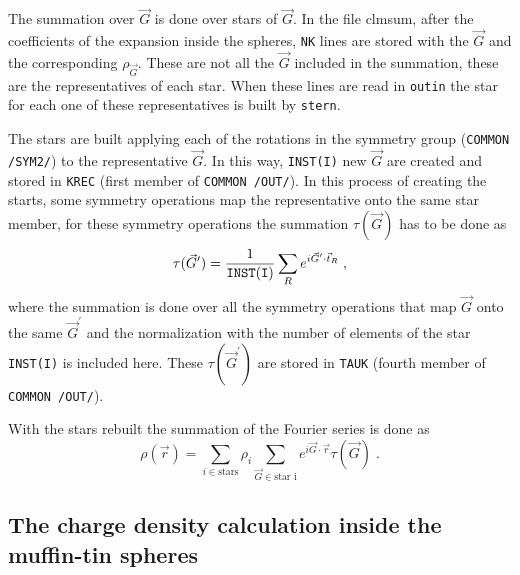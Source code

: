 \documentclass{article}
\begin{document}
The summation over $\vec{G}$ is done over stars of $\vec{G}$. In
the file clmsum, after the coefficients of the expansion inside the
spheres, \texttt{NK} lines are stored with the $\vec{G}$ and the
corresponding $\rho_{\vec{G}}$. These are not all the $\vec{G}$
included in the summation, these are the representatives of each
star. When these lines are read in \texttt{outin} the star for each
one of these representatives is built by \texttt{stern}.

The stars are built applying each of the rotations in the symmetry
group (\texttt{COMMON /SYM2/}) to the representative $\vec{G}$. In
this way, \texttt{INST(I)} new $\vec{G}$ are created and stored in
\texttt{KREC} (first member of \texttt{COMMON /OUT/}). In this process
of creating the starts, some symmetry operations map the
representative onto the same star member, for these symmetry
operations the summation $\tau(\vec{G})$ has to be done as 
\[
\tau(\vec{G}^\prime)={1\over \mathtt{INST(I)}} \sum_R e^{i\vec{G}^\prime\cdot\vec{t}_R}\;,
\]
where the summation is done over all the symmetry operations that map
$\vec{G}$ onto the same $\vec{G}^\prime$ and the normalization
with the number of elements of the star \texttt{INST(I)} is included
here.  These $\tau(\vec{G}^\prime)$ are stored in \texttt{TAUK}
(fourth member of \texttt{COMMON /OUT/}).

With the stars rebuilt the summation of the Fourier series is done as
\begin{equation}
\rho(\vec{r})=\sum_{i\in\mbox{stars}}\rho_i\sum_{\vec{G}\in\mbox{star
i}}e^{i\vec{G}\cdot\vec{r}}\tau(\vec{G})\;.
\label{rhoinst}
\end{equation}

\subsection{The charge density calculation inside
the muffin-tin spheres}
\end{document}
